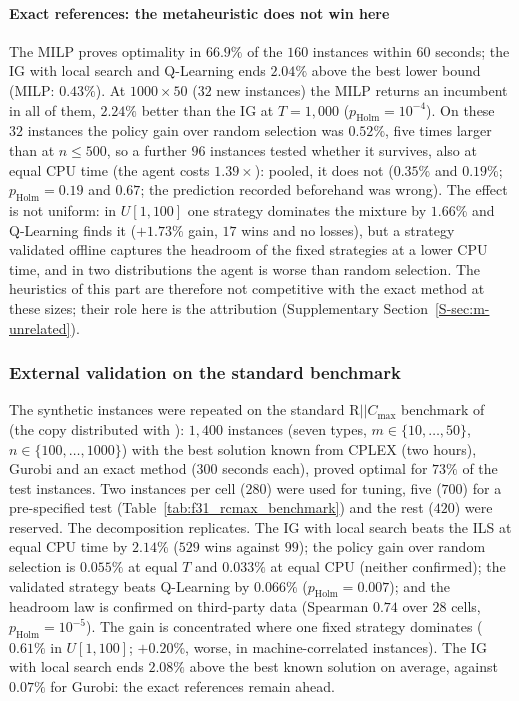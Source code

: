 \paragraph{Exact references: the metaheuristic does not win here}
The MILP proves optimality in $66.9\%$ of the $160$ instances within $60$ seconds; the IG with local search and Q-Learning ends $2.04\%$ above the best lower bound (MILP: $0.43\%$). At $1000\times50$ ($32$ new
instances) the MILP returns an incumbent in all of them, $2.24\%$ better than the IG at $T=1{,}000$ ($p_{\mathrm{Holm}}=10^{-4}$). On these $32$ instances the policy gain over random selection was $0.52\%$, five times larger than at
$n\leq500$, so a further $96$ instances tested whether it survives, also at equal CPU time (the agent costs $1.39\times$): pooled, it does not ($0.35\%$ and $0.19\%$; $p_{\mathrm{Holm}}=0.19$ and $0.67$; the prediction recorded beforehand was wrong).
The effect is not uniform: in $U[1,100]$ one strategy dominates the mixture by $1.66\%$ and Q-Learning finds it ($+1.73\%$ gain, $17$ wins and no losses), but a strategy validated offline captures the headroom of the fixed strategies at a lower CPU time, and in two
distributions the agent is worse than random selection. The heuristics of this part are therefore not competitive with the exact method at these sizes; their role here is the attribution (Supplementary Section~\ref{S-sec:m-unrelated}).

\subsubsection*{External validation on the standard benchmark}
The synthetic instances were repeated on the standard $\mathrm{R}||C_{\max}$ benchmark of \citet{FanjulPeyroRuiz2010} (the copy distributed with \citealt{AbladEtAl2021}): $1{,}400$ instances (seven types,
$m\in\{10,\ldots,50\}$, $n\in\{100,\ldots,1000\}$) with the best solution known from CPLEX (two hours), Gurobi and an exact method (300 seconds each), proved optimal for $73\%$ of the test instances. Two instances per cell
($280$) were used for tuning, five ($700$) for a pre-specified test (Table~\ref{tab:f31_rcmax_benchmark}) and the rest ($420$) were reserved. The decomposition replicates. The IG with local search beats the ILS at equal CPU
time by $2.14\%$ ($529$ wins against $99$); the policy gain over random selection is $0.055\%$ at equal $T$ and $0.033\%$ at equal CPU (neither confirmed); the validated strategy beats Q-Learning by $0.066\%$
($p_{\mathrm{Holm}}=0.007$); and the headroom law is confirmed on third-party data (Spearman $0.74$ over $28$ cells, $p_{\mathrm{Holm}}=10^{-5}$). The gain is concentrated where one fixed strategy dominates
($0.61\%$ in $U[1,100]$; $+0.20\%$, worse, in machine-correlated instances). The IG with local search ends $2.08\%$ above the best known solution on average, against $0.07\%$ for Gurobi: the exact references remain ahead.

